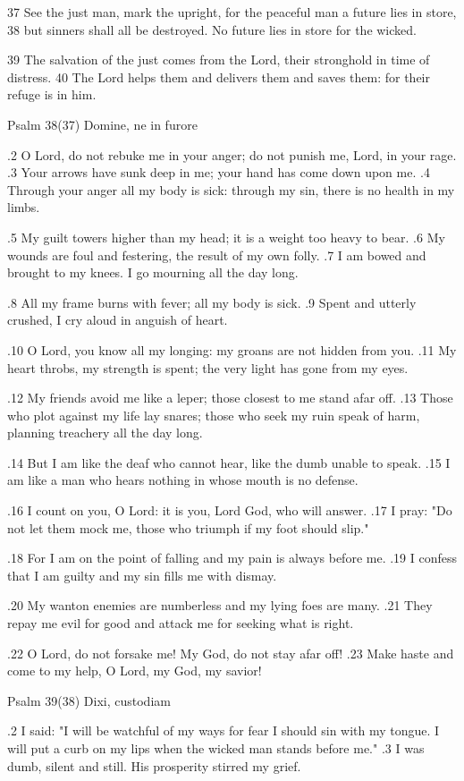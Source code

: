 37 See the just man, mark the upright,
for the peaceful man a future lies in store,
38 but sinners shall all be destroyed.
No future lies in store for the wicked.

39 The salvation of the just comes from the Lord,
their stronghold in time of distress.
40 The Lord helps them and delivers them
and saves them: for their refuge is in him.


Psalm 38(37) Domine, ne in furore

.2 O Lord, do not rebuke me in your anger;
do not punish me, Lord, in your rage.
.3 Your arrows have sunk deep in me;
your hand has come down upon me.
.4 Through your anger all my body is sick:
through my sin, there is no health in my limbs.

.5 My guilt towers higher than my head;
it is a weight too heavy to bear.
.6 My wounds are foul and festering,
the result of my own folly.
.7 I am bowed and brought to my knees.
I go mourning all the day long.

.8 All my frame burns with fever;
all my body is sick.
.9 Spent and utterly crushed,
I cry aloud in anguish of heart.

.10 O Lord, you know all my longing:
my groans are not hidden from you.
.11 My heart throbs, my strength is spent;
the very light has gone from my eyes.

.12 My friends avoid me like a leper;
those closest to me stand afar off.
.13 Those who plot against my life lay snares;
those who seek my ruin speak of harm,
planning treachery all the day long.

.14 But I am like the deaf who cannot hear,
like the dumb unable to speak.
.15 I am like a man who hears nothing
in whose mouth is no defense.

.16 I count on you, O Lord:
it is you, Lord God, who will answer.
.17 I pray: "Do not let them mock me,
those who triumph if my foot should slip."

.18 For I am on the point of falling
and my pain is always before me.
.19 I confess that I am guilty
and my sin fills me with dismay.

.20 My wanton enemies are numberless
and my lying foes are many.
.21 They repay me evil for good
and attack me for seeking what is right.

.22 O Lord, do not forsake me!
My God, do not stay afar off!
.23 Make haste and come to my help,
O Lord, my God, my savior!


Psalm 39(38) Dixi, custodiam

.2 I said: "I will be watchful of my ways
for fear I should sin with my tongue.
I will put a curb on my lips
when the wicked man stands before me."
.3 I was dumb, silent and still.
His prosperity stirred my grief.

